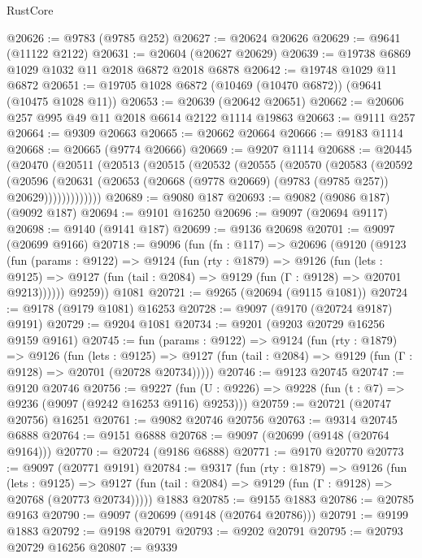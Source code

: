 \begin{lexlean}{RustCore}
\begin{coremodule}
@20626 := @9783 (@9785 @252)
@20627 := @20624 @20626
@20629 := @9641 (@11122 @2122)
@20631 := @20604 (@20627 @20629)
@20639 := @19738 @6869 @1029 @1032 @11 @2018 @6872 @2018 @6878
@20642 := @19748 @1029 @11 @6872
@20651 := @19705 @1028 @6872 (@10469 (@10470 @6872)) (@9641 (@10475 @1028 @11))
@20653 := @20639 (@20642 @20651)
@20662 := @20606 @257 @995 @49 @11 @2018 @6614 @2122 @1114 @19863
@20663 := @9111 @257
@20664 := @9309 @20663
@20665 := @20662 @20664
@20666 := @9183 @1114
@20668 := @20665 (@9774 @20666)
@20669 := @9207 @1114
@20688 := @20445
    (@20470
      (@20511
        (@20513
          (@20515
            (@20532
              (@20555
                (@20570
                  (@20583
                    (@20592
                      (@20596
                        (@20631
                          (@20653 (@20668 (@9778 @20669) (@9783 (@9785 @257)) @20629)))))))))))))
@20689 := @9080 @187
@20693 := @9082 (@9086 @187) (@9092 @187)
@20694 := @9101 @16250
@20696 := @9097 (@20694 @9117)
@20698 := @9140 (@9141 @187)
@20699 := @9136 @20698
@20701 := @9097 (@20699 @9166)
@20718 := @9096
    (fun (fn : @117) =>
    @20696
      (@9120
        (@9123
          (fun (params : @9122) =>
          @9124
            (fun (rty : @1879) =>
            @9126
              (fun (lets : @9125) =>
              @9127 (fun (tail : @2084) => @9129 (fun (Γ : @9128) => @20701 @9213))))))
        @9259))
    @1081
@20721 := @9265 (@20694 (@9115 @1081))
@20724 := @9178 (@9179 @1081) @16253
@20728 := @9097 (@9170 (@20724 @9187) @9191)
@20729 := @9204 @1081
@20734 := @9201 (@9203 @20729 @16256 @9159 @9161)
@20745 := fun (params : @9122) =>
  @9124
    (fun (rty : @1879) =>
    @9126
      (fun (lets : @9125) =>
      @9127 (fun (tail : @2084) => @9129 (fun (Γ : @9128) => @20701 (@20728 @20734)))))
@20746 := @9123 @20745
@20747 := @9120 @20746
@20756 := @9227
    (fun (U : @9226) => @9228 (fun (t : @7) => @9236 (@9097 (@9242 @16253 @9116) @9253)))
@20759 := @20721 (@20747 @20756) @16251
@20761 := @9082 @20746 @20756
@20763 := @9314 @20745 @6888
@20764 := @9151 @6888
@20768 := @9097 (@20699 (@9148 (@20764 @9164)))
@20770 := @20724 (@9186 @6888)
@20771 := @9170 @20770
@20773 := @9097 (@20771 @9191)
@20784 := @9317
    (fun (rty : @1879) =>
    @9126
      (fun (lets : @9125) =>
      @9127 (fun (tail : @2084) => @9129 (fun (Γ : @9128) => @20768 (@20773 @20734)))))
    @1883
@20785 := @9155 @1883
@20786 := @20785 @9163
@20790 := @9097 (@20699 (@9148 (@20764 @20786)))
@20791 := @9199 @1883
@20792 := @9198 @20791
@20793 := @9202 @20791
@20795 := @20793 @20729 @16256
@20807 := @9339

\end{coremodule}
\end{lexlean}
